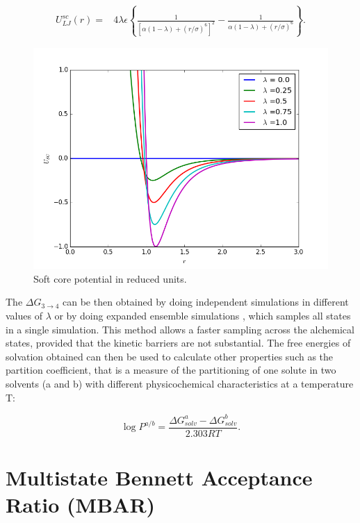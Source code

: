 	\begin{equation}
	\label{eq:softcoreLJ}
	\begin{aligned}
	U_{LJ}^{sc}(r) {}=& 4\lambda\epsilon \left\lbrace\frac{1}{\left[\alpha(1-\lambda)+ (r/\sigma)^{6}\right]^{2}} - \frac{1}{\alpha(1-\lambda)+(r/\sigma)^{6}}\right\rbrace .
	\end{aligned}
	\end{equation}
	
	\begin{figure}[H]
		\centering
		\includegraphics[width=0.9\linewidth]{Figures/SC}
		\caption{Soft core potential in reduced units.}
		\label{fig:SC}
	\end{figure}
	
	The $\Delta G_{3 \rightarrow 4}$ can be then obtained by doing independent simulations in different values of $\lambda$ or by doing expanded ensemble simulations \cite{lyubartsev}, which samples all states in a single simulation. This method allows a faster sampling across the alchemical states, provided that the kinetic barriers are not substantial. The free energies of solvation obtained can then be used to calculate other properties such as the partition coefficient, that is a measure of the partitioning of one solute in two solvents (a and b) with different physicochemical characteristics  at a temperature T:
	
	\begin{equation}
	\label{eqn:partcoe}
	\log{P}^{a/b} = \frac{\Delta G_{solv}^{a} - \Delta G_{solv}^{b}}{2.303RT} .
	\end{equation}
	
	
	
\section{Multistate Bennett Acceptance Ratio (MBAR)}\label{mbar}
	
